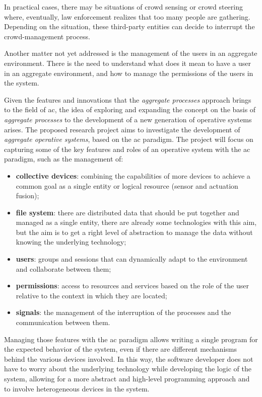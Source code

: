 \documentclass[12pt, a4paper]{article}
\begin{document}
In practical cases, there may be situations of crowd sensing or crowd steering where,
eventually,
law enforcement realizes that too many people are gathering.
%
Depending on the situation,
these third-party entities can decide to interrupt the crowd-management process.

Another matter not yet addressed is the management of the users in an aggregate environment.
%
There is the need to understand what does it mean to have a user in an aggregate environment,
and how to manage the permissions of the users in the system.

Given the features and innovations that the \emph{aggregate processes} approach brings to the field of \ac{ac},
the idea of exploring and expanding the concept on the basis of \emph{aggregate processes} to the development
of a new generation of operative systems arises.
%
The proposed research project aims to investigate the development of \emph{aggregate operative systems},
based on the \ac{ac} paradigm.
%
The project will focus on capturing some of the key features and roles of an operative system with the \ac{ac} paradigm,
such as the management of:
\begin{itemize}
    \item \textbf{collective devices}: combining the capabilities of more devices to achieve a common goal as a single
        entity or logical resource (sensor and actuation fusion);
    \item \textbf{file system}: there are distributed data that should be put together and managed as a single entity,
        there are already some technologies with this aim, but the aim is to get a right level of abstraction to manage the data
        without knowing the underlying technology;
    \item \textbf{users}: groups and sessions that can dynamically adapt to the environment and collaborate between them;
    \item \textbf{permissions}: access to resources and services based on the role of the user relative to the context in which they are located;
    \item \textbf{signals}: the management of the interruption of the processes and the communication between them.
\end{itemize}

Managing those features with the \ac{ac} paradigm allows writing a single program for the expected behavior of the system,
even if there are different mechanisms behind the various devices involved.
%
In this way,
the software developer does not have to worry about the underlying technology while developing the logic of the system,
allowing for a more abstract and high-level programming approach and to involve heterogeneous devices in the system.
\end{document}

